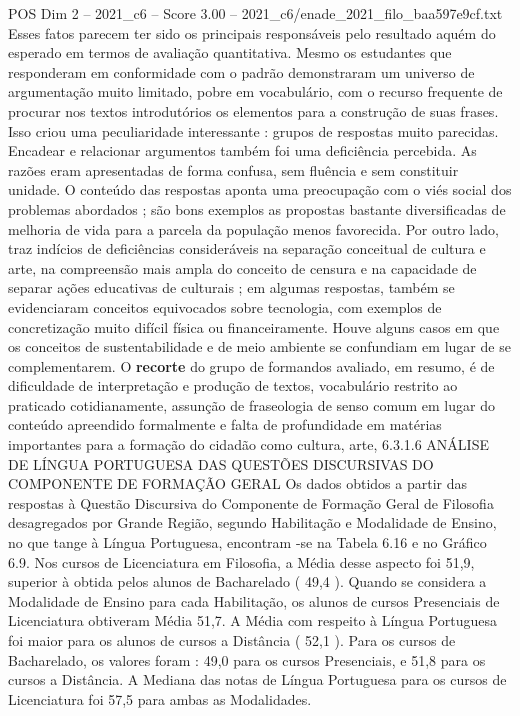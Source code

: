 \begin{textsample}{POS Dim 2 – 2021\_c6 – Score 3.00 – 2021\_c6/enade\_2021\_filo\_baa597e9cf.txt}
Esses fatos parecem ter sido os principais responsáveis pelo resultado aquém do esperado em termos de avaliação quantitativa.
Mesmo os estudantes que responderam em conformidade com o padrão demonstraram um universo de argumentação muito limitado, pobre em vocabulário, com o recurso frequente de procurar nos textos introdutórios os elementos para a construção de suas frases.
Isso criou uma peculiaridade interessante : grupos de respostas muito parecidas.
Encadear e relacionar argumentos também foi uma deficiência percebida.
As razões eram apresentadas de forma confusa, sem fluência e sem constituir unidade.
O conteúdo das respostas aponta uma preocupação com o viés social dos problemas abordados ; são bons exemplos as propostas bastante diversificadas de melhoria de vida para a parcela da população menos favorecida.
Por outro lado, traz indícios de deficiências consideráveis na separação conceitual de cultura e arte, na compreensão mais ampla do conceito de censura e na capacidade de separar ações educativas de culturais ; em algumas respostas, também se evidenciaram conceitos equivocados sobre tecnologia, com exemplos de concretização muito difícil física ou financeiramente.
Houve alguns casos em que os conceitos de sustentabilidade e de meio ambiente se confundiam em lugar de se complementarem.
O \textbf{recorte} do grupo de formandos avaliado, em resumo, é de dificuldade de interpretação e produção de textos, vocabulário restrito ao praticado cotidianamente, assunção de fraseologia de senso comum em lugar do conteúdo apreendido formalmente e falta de profundidade em matérias importantes para a formação do cidadão como cultura, arte, 6.3.1.6 ANÁLISE DE LÍNGUA PORTUGUESA DAS QUESTÕES DISCURSIVAS DO COMPONENTE DE FORMAÇÃO GERAL Os dados obtidos a partir das respostas à Questão Discursiva do Componente de Formação Geral de Filosofia desagregados por Grande Região, segundo Habilitação e Modalidade de Ensino, no que tange à Língua Portuguesa, encontram -se na Tabela 6.16 e no Gráfico 6.9.
Nos cursos de Licenciatura em Filosofia, a Média desse aspecto foi 51,9, superior à obtida pelos alunos de Bacharelado ( 49,4 ).
Quando se considera a Modalidade de Ensino para cada Habilitação, os alunos de cursos Presenciais de Licenciatura obtiveram Média 51,7.
A Média com respeito à Língua Portuguesa foi maior para os alunos de cursos a Distância ( 52,1 ).
Para os cursos de Bacharelado, os valores foram : 49,0 para os cursos Presenciais, e 51,8 para os cursos a Distância.
A Mediana das notas de Língua Portuguesa para os cursos de Licenciatura foi 57,5 para ambas as Modalidades.

\end{textsample}
